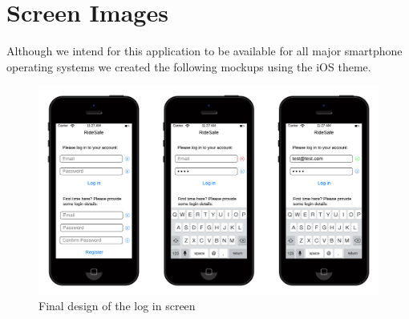 \documentclass[a4paper]{report}
\begin{document}
\section{Screen Images}
Although we intend for this application to be available for all major smartphone operating systems we created the following mockups using the iOS theme.
\begin{figure}[h]
\centering
\includegraphics[scale=0.6]{figures/final_design/log_in}
\caption{Final design of the log in screen}
\end{figure}
\end{document}
